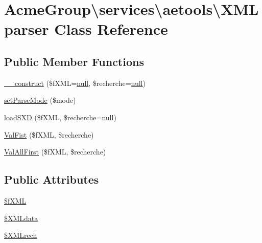 \hypertarget{class_acme_group_1_1services_1_1aetools_1_1_x_m_lparser}{\section{Acme\+Group\textbackslash{}services\textbackslash{}aetools\textbackslash{}X\+M\+Lparser Class Reference}
\label{class_acme_group_1_1services_1_1aetools_1_1_x_m_lparser}
}
\subsection*{Public Member Functions}
\begin{DoxyCompactItemize}
\item 
\hyperlink{class_acme_group_1_1services_1_1aetools_1_1_x_m_lparser_a03182e350ab657bd093621350c44db59}{\+\_\+\+\_\+construct} (\$f\+X\+M\+L=\hyperlink{validate_8js_afb8e110345c45e74478894341ab6b28e}{null}, \$recherche=\hyperlink{validate_8js_afb8e110345c45e74478894341ab6b28e}{null})
\item 
\hyperlink{class_acme_group_1_1services_1_1aetools_1_1_x_m_lparser_a7061e9ab5ab994d78eb910d7c00c9d73}{set\+Parse\+Mode} (\$mode)
\item 
\hyperlink{class_acme_group_1_1services_1_1aetools_1_1_x_m_lparser_a28667d4d58579aff84ff762c6c2bf0fe}{load\+S\+X\+D} (\$f\+X\+M\+L, \$recherche=\hyperlink{validate_8js_afb8e110345c45e74478894341ab6b28e}{null})
\item 
\hyperlink{class_acme_group_1_1services_1_1aetools_1_1_x_m_lparser_a8a850a01617e608ed4b15ac1115f1b8f}{Val\+Fist} (\$f\+X\+M\+L, \$recherche)
\item 
\hyperlink{class_acme_group_1_1services_1_1aetools_1_1_x_m_lparser_afd191e3fa4818a38f846b5bcbd777640}{Val\+All\+First} (\$f\+X\+M\+L, \$recherche)
\end{DoxyCompactItemize}
\subsection*{Public Attributes}
\begin{DoxyCompactItemize}
\item 
\hyperlink{class_acme_group_1_1services_1_1aetools_1_1_x_m_lparser_acbda79c808fe81cff55db8648725da8c}{\$f\+X\+M\+L}
\item 
\hyperlink{class_acme_group_1_1services_1_1aetools_1_1_x_m_lparser_ae5d29fcae693c85c9e6f076dfe6327af}{\$\+X\+M\+Ldata}
\item 
\hyperlink{class_acme_group_1_1services_1_1aetools_1_1_x_m_lparser_ace5fba31ca322e000d2ee3caf63eef90}{\$\+X\+M\+Lrech}
\end{DoxyCompactItemize}


